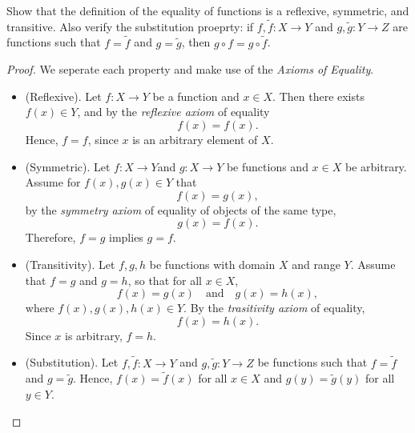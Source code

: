 \begin{exercise}[3.3.1] 
     Show that the definition of the equality of functions is a
     reflexive, symmetric, and transitive. Also verify the substitution
     proeprty: if $f, \tilde{f}:X \to Y$ and $g,\tilde{g}:Y\to Z$ are functions
     such that $f=\tilde{f}$ and $g=\tilde{g}$, then $g\circ f = g\circ
     \tilde{f}$.
     \begin{proof}
          We seperate each property and make use of the \emph{Axioms of
          Equality}.
          \begin{itemize}
              \item(Reflexive). Let $f:X\to Y$ be a function and $x\in X$. Then
              there exists $f(x)\in Y$, and by the \emph{reflexive axiom} of
              equality
              \begin{equation*}
                  f(x)=f(x).
              \end{equation*}
              Hence, $f=f$, since $x$ is an arbitrary element of $X$.
              \item(Symmetric). Let $f:X\to Y$and $g:X\to Y$ be functions and
              $x\in X$ be arbitrary. Assume for $f(x), g(x)\in Y$ that
              \begin{equation*}
                  f(x)=g(x),
              \end{equation*}
              by the \emph{symmetry axiom} of equality of objects of the same type,
              \begin{equation*}
                  g(x)=f(x).
              \end{equation*}
              Therefore, $f=g$ implies $g=f$.
              \item(Transitivity). Let $f,g,h$ be functions with domain $X$ and
              range $Y$. Assume that $f=g$ and $g=h$, so that for all $x\in X$,
              \begin{equation*}
                  f(x)=g(x) \quad \text{and} \quad g(x)=h(x),
              \end{equation*}
              where $f(x),g(x),h(x)\in Y$. By the \emph{trasitivity axiom} of
              equality, 
              \begin{equation*}
                  f(x)=h(x).
              \end{equation*}
              Since $x$ is arbitrary, $f=h$.
              \pagebreak
              \item(Substitution). Let $f,\tilde{f}:X\to Y$ and
              $g,\tilde{g}:Y\to Z$ be functions such that $f=\tilde{f}$ and
              $g=\tilde{g}$. Hence, $f(x)=\tilde{f}(x)$ for all $x\in X$ and
              $g(y)=\tilde{g}(y)$ for all $y\in Y$.


\end{itemize}
\end{proof}
\end{exercise}
